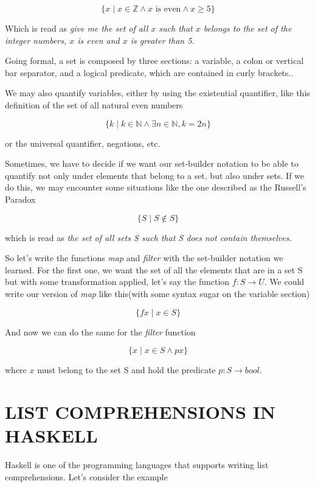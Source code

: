 \documentclass[%
 reprint,
 amsmath,amssymb,
 aps,
]{revtex4-1}
\begin{document}
    \[
    \{ x \mid x \in \mathbb{Z} \wedge x  \textrm{ is even} \wedge x \geq 5 \}
    \]

    Which is read as \emph{give me the set of all $x$ such that $x$ belongs to the set of the integer numbers, $x$ is even and $x$ is greater than 5}.

    Going formal, a set is composed by three sections: a variable, a colon or vertical bar separator, and a logical predicate, which are contained in curly brackets.\cite{wikipedia}.

    We may also quantify variables, either by using the existential quantifier,  like this definition of the set of all natural even numbers

    \[
    \{ k \mid k \in \mathbb{N} \wedge \exists n \in \mathbb{N}, k = 2n\}
    \]

    or the universal quantifier, negations, etc.

    Sometimes, we have to decide if we want our set-builder notation to be able to quantify not only under elements that belong to a set, but also under sets. If we do this, we may encounter some situations like the one described as the Russell's Paradox

    \[
    \{ S \mid S \notin S \}
    \]

    which is read as \emph{the set of all sets S such that S does not contain themselves}.

    So let's write the functions \emph{map} and \emph{filter} with the set-builder notation we learned. For the first one, we want the set of all the elements that are in a set S but with some transformation applied, let's say the function $f : S \longrightarrow U$. We could write our version of \emph{map} like this(with some syntax sugar on the variable section)

    \[
    \{ f x \mid x \in S\}
    \]

    And now we can do the same for the \emph{filter} function

    \[\{ x \mid x \in S \wedge p x \}\]

    where $x$ must belong to the set S and hold the predicate $p:S \longrightarrow bool$.

\section{LIST COMPREHENSIONS IN HASKELL}

	Haskell is one of the programming languages that supports writing list comprehensions. Let's consider the example
\end{document}
